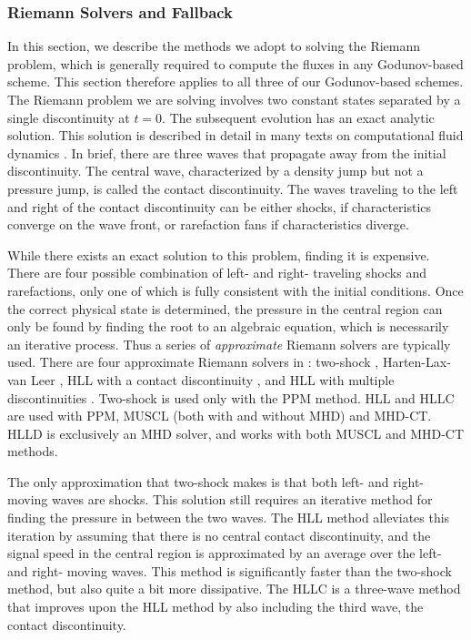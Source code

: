 \subsubsection{Riemann Solvers and Fallback}
\label{sec.riemann}

In this section, we describe the methods we adopt to solving the Riemann
problem, which is generally required to compute the fluxes in 
any Godunov-based scheme.  This section therefore applies to all three of our 
Godunov-based schemes.  The Riemann problem we are solving
involves two constant states separated by a single discontinuity at $t=0$.
The subsequent evolution has an exact analytic solution.  This solution is
described in detail in many texts on computational fluid dynamics
\citep[e.g.,][]{toro-1997}.   In brief, there are three waves that propagate
away from the initial discontinuity.  The central wave, characterized by a
density jump but not a pressure jump, is called the contact discontinuity.  The
waves traveling to the left and right of the contact discontinuity can be either
shocks, if characteristics converge on the wave front, or rarefaction fans if
characteristics diverge.  

While there exists an exact solution to this problem, finding it is expensive.  There are four
possible combination of left- and right- traveling shocks and rarefactions,
only one of which is fully consistent with the initial conditions.  Once the
correct physical state is determined, the pressure in the central region can
only be found by finding the root to an algebraic equation, which is necessarily
an iterative process.  Thus a series of \emph{approximate} Riemann solvers are
typically used.  There are four approximate Riemann solvers in \enzo: two-shock
\citep{toro-1997},
Harten-Lax-van Leer \citep[HLL,][]{toro-1997}, HLL with a contact discontinuity
 \citep[HLLC,][]{toro-1997}, and HLL with
multiple discontinuities \citep[HLLD,][]{Miyoshi05}.  Two-shock is used only
with the PPM method.  HLL and HLLC are used with PPM, MUSCL (both with and
without MHD) and MHD-CT.  HLLD is exclusively an MHD solver, and works with both
MUSCL and MHD-CT methods.  

The only approximation that two-shock makes is that both left- and right- moving
waves are shocks.  This solution still requires an iterative method for finding
the pressure in between the two waves.  The HLL method alleviates this iteration
by assuming that there is no central contact discontinuity, and the signal speed
in the central region is approximated by an average over the left- and right-
moving waves.  This method is significantly faster than the two-shock method,
but also quite a bit more dissipative.  The HLLC is a three-wave method that improves upon the HLL
method by also including the third wave, the contact discontinuity.  

